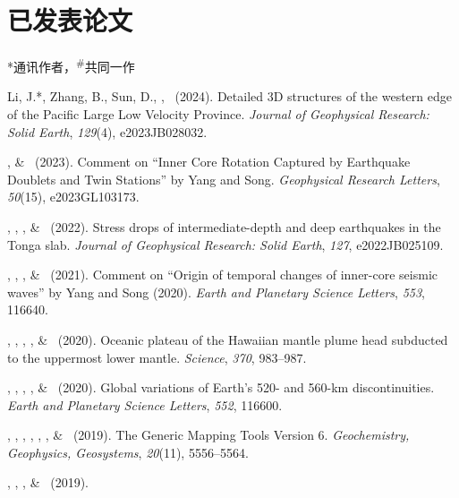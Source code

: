 \section{已发表论文}
\newcommand{\Revision}{\emph{正在审稿}}
\newcommand{\CS}{*} %
\newcommand{\CF}{\textsuperscript{\#}} %

\CS 通讯作者，\CF 共同一作
\begin{etaremune}
\item Li, J.\CS, Zhang, B., Sun, D., \Me, \JYao\ (2024).
    Detailed 3D structures of the western edge of the Pacific Large Low Velocity Province.
    \emph{Journal of Geophysical Research: Solid Earth}, \emph{129}(4), e2023JB028032.
\item \Me\CS, \& \LWen\ (2023).
    Comment on ``Inner Core Rotation Captured by Earthquake Doublets and Twin Stations'' by Yang and Song.
    \emph{Geophysical Research Letters}, \emph{50}(15), e2023GL103173.
\item \Me\CS, \SWei\CS, \WWang, \& \FWang\ (2022).
    Stress drops of intermediate-depth and deep earthquakes in the Tonga slab.
    \emph{Journal of Geophysical Research: Solid Earth}, \emph{127}, e2022JB025109.
\item \JYao\CS, \Me, \LSun, \& \LWen\ (2021).
    Comment on ``Origin of temporal changes of inner-core seismic waves'' by Yang and Song (2020).
    \emph{Earth and Planetary Science Letters}, \emph{553}, 116640.
\item \SWei\CS, \PShearer, \CLithgowBertelloni, \LStixrude, \& \Me\ (2020).
    Oceanic plateau of the Hawaiian mantle plume head subducted to the uppermost lower mantle.
    \emph{Science}, \emph{370}, 983--987.
\item \Me\CS, \MLv, \SWei, \SDorfman, \& \PShearer\ (2020).
    Global variations of Earth's 520- and 560-km discontinuities.
    \emph{Earth and Planetary Science Letters}, \emph{552}, 116600. \\
\item
    \PWessel\CS, \JLuis, \LUieda, \RScharroo, \FWobbe, \WSmith, \& \Me\ (2019).
    The Generic Mapping Tools Version 6.
    \emph{Geochemistry, Geophysics, Geosystems}, \emph{20}(11), 5556--5564.
\item
    \JYao\CS, \Me, \LSun, \& \LWen\ (2019).

\end{etaremune}

